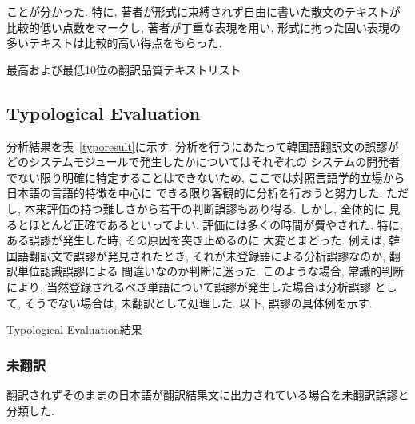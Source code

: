 \vspace{0.5cm}

\begin{flushleft}
ことが分かった. 特に, 著者が形式に束縛されず自由に書いた散文のテキストが
比較的低い点数をマークし, 著者が丁重な表現を用い, 形式に拘った固い表現の
多いテキストは比較的高い得点をもらった. 
\end{flushleft}

\begin{table}
\begin{center}
\caption{\label{tbtextlist} 最高および最低10位の翻訳品質テキストリスト}
\end{center}
\end{table}

\subsection{Typological Evaluation}
分析結果を表~\ref{typoresult}に示す. 分析を行うにあたって韓国語翻訳文の誤謬がどのシステムモジュールで発生したかについてはそれぞれの
システムの開発者でない限り明確に特定することはできないため, ここでは対照言語学的立場から日本語の言語的特徴を中心に
できる限り客観的に分析を行おうと努力した. ただし, 本来評価の持つ難しさから若干の判断誤謬もあり得る. しかし, 全体的に
見るとほとんど正確であるといってよい. 評価には多くの時間が費やされた. 特に, ある誤謬が発生した時, その原因を突き止めるのに
大変とまどった. 例えば, 韓国語翻訳文で誤謬が発見されたとき, それが未登録語による分析誤謬なのか, 翻訳単位認識誤謬による
間違いなのか判断に迷った. このような場合, 常識的判断により, 当然登録されるべき単語について誤謬が発生した場合は分析誤謬
として, そうでない場合は, 未翻訳として処理した. 以下, 誤謬の具体例を示す. 

\begin{table}
\begin{center}
\caption{\label{typoresult} Typological Evaluation結果}
\end{center}
\end{table}
\vspace{1cm}

\subsubsection{未翻訳}
翻訳されずそのままの日本語が翻訳結果文に出力されている場合を未翻訳誤謬と
分類した. 

\vspace{0.5cm}

